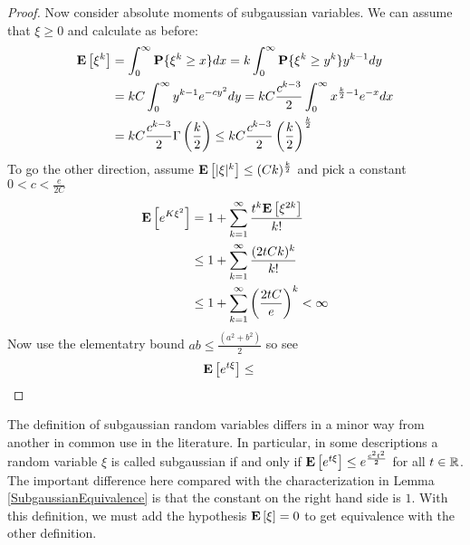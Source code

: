 \begin{proof}
Now consider absolute moments of subgaussian variables.  We can assume
that $\xi \geq 0$ and calculate as before:
\begin{align*}
\textbf{E}\left[\xi^k\right] 
&= \int_0^\infty \textbf{P}\{\xi^k \geq x\} dx 
= k\int_0^\infty \textbf{P}\{\xi^k \geq y^k\} y^{k-1} dy \\
&= k C \int_0^\infty y^{k-1} e^{-cy^2} dy 
= k C \frac{c^{k-3}}{2} \int_0^\infty x^{\frac{k}{2}-1} e^{-x} dx \\
&= k C \frac{c^{k-3}}{2} \Gamma\left(\frac{k}{2}\right) 
\leq k C \frac{c^{k-3}}{2} \left(\frac{k}{2}\right)^\frac{k}{2} \\
\end{align*}
To go the other direction, assume $\textbf{E}\left[|\xi|^k\right] \leq
(Ck)^\frac{k}{2}$ and pick a constant $0 < c < \frac{e}{2C}$ 
\begin{align*}
\textbf{E}\left[e^{K\xi^2}\right] &= 1 + \sum_{k=1}^\infty
\frac{t^k\textbf{E}\left[\xi^{2k}\right]}{k!}\\
&\leq 1 + \sum_{k=1}^\infty
\frac{(2tCk)^k}{k!}\\
&\leq 1 + \sum_{k=1}^\infty
\left(\frac{2tC}{e}\right)^k < \infty \\
\end{align*}
Now use the elementatry bound $ab \leq \frac{(a^2 + b^2)}{2}$ so see
\begin{align*}
\textbf{E}\left[e^{t\xi}\right] &\leq 
\end{align*}
\end{proof}

The definition of subgaussian random variables differs in a minor way
from another in common use in the literature.  In particular, in some descriptions a random
variable $\xi$ is called subgaussian if and only if
$\textbf{E}\left[e^{t\xi}\right] \leq e^{\frac{c^2 t^2}{2}}$ for all $t \in \mathbb{R}$.  The important
difference here compared with the characterization in Lemma
\ref{SubgaussianEquivalence} is that the constant on the right hand side is $1$.
With this definition, we must add the hypothesis $\textbf{E}\left[\xi\right]=0$
to get equivalence with the other definition.

